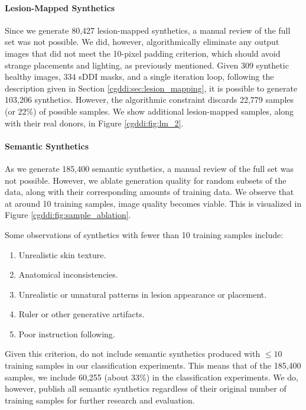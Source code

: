 \documentclass[11pt]{ucthesis}
\begin{document}
\paragraph{Lesion-Mapped Synthetics}
\label{cgddi:sec:discard_mapping}
Since we generate 80,427 lesion-mapped synthetics, a manual review of the full set was not possible. We did, however, algorithmically eliminate any output images that did not meet the 10-pixel padding criterion, which should avoid strange placements and lighting, as previously mentioned. Given 309 synthetic healthy images, 334 sDDI masks, and a single iteration loop, following the description given in Section \ref{cgddi:sec:lesion_mapping}, it is possible to generate 103,206 synthetics. However, the algorithmic constraint discards 22,779 samples (or 22\%) of possible samples. We show additional lesion-mapped samples, along with their real donors, in Figure \ref{cgddi:fig:lm_2}.

\paragraph{Semantic Synthetics}
\label{cgddi:sec:semantic_discard}
As we generate 185,400 semantic synthetics, a manual review of the full set was not possible. However, we ablate generation quality for random subsets of the data, along with their corresponding amounts of training data. We observe that at around 10 training samples, image quality becomes viable. This is visualized in Figure \ref{cgddi:fig:sample_ablation}.

Some observations of synthetics with fewer than 10 training samples include: 
\begin{enumerate}
    \item Unrealistic skin texture.
    \item Anatomical inconsistencies.
    \item Unrealistic or unnatural patterns in lesion appearance or placement.
    \item Ruler or other generative artifacts.
    \item Poor instruction following.
\end{enumerate}

Given this criterion, do not include semantic synthetics produced with $\leq 10$ training samples in our classification experiments. This means that of the 185,400 samples, we include 60,255 (about 33\%) in the classification experiments. We do, however, publish all semantic synthetics regardless of their original number of training samples for further research and evaluation.
\end{document}
